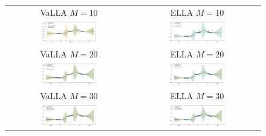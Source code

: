 \documentclass[aspectratio=149]{beamer}
\begin{document}
    \begin{frame}
        \begin{figure}
        	\begin{center}
        	\begin{tabular}{cc}
            {\scriptsize VaLLA \(M = 10\)} & {\scriptsize ELLA \(M = 10\)} \\
        	\includegraphics[width=0.45\textwidth]{imgs/SparseLA_M=10.pdf} & 
            \includegraphics[width=0.45\textwidth]{imgs/ELLA_synthetic2_M=10.pdf} \\
            {\scriptsize VaLLA \(M = 20\)} & {\scriptsize ELLA \(M = 20\)} \\
            \includegraphics[width=0.45\textwidth]{imgs/SparseLA_M=20.pdf} & 
            \includegraphics[width=0.45\textwidth]{imgs/ELLA_synthetic2_M=20.pdf} \\
            {\scriptsize VaLLA \(M = 30\)} & {\scriptsize ELLA \(M = 30\)} \\
            \includegraphics[width=0.45\textwidth]{imgs/SparseLA_M=30.pdf} &
            \includegraphics[width=0.45\textwidth]{imgs/ELLA_synthetic2_M=30.pdf} 
        	\end{tabular}
        	\end{center}
        \end{figure}
    \end{frame}
\end{document}
